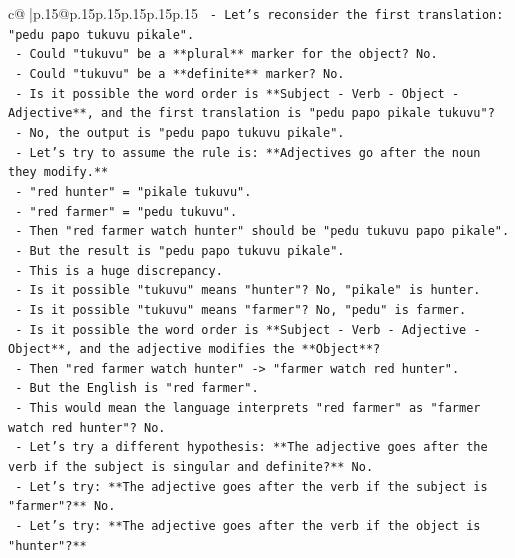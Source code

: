 \documentclass{article}
\begin{document}
{\begin{supertabular}{c@{$\;$}|p{.15\linewidth}@{}p{.15\linewidth}p{.15\linewidth}p{.15\linewidth}p{.15\linewidth}p{.15\linewidth}}
{{{\texttt{       {-} Let's reconsider the first translation: "pedu papo tukuvu pikale".} \\
\texttt{       {-} Could "tukuvu" be a **plural** marker for the object? No.} \\
\texttt{       {-} Could "tukuvu" be a **definite** marker? No.} \\
\texttt{       {-} Is it possible the word order is **Subject {-} Verb {-} Object {-} Adjective**, and the first translation is "pedu papo pikale tukuvu"?} \\
\texttt{         {-} No, the output is "pedu papo tukuvu pikale".} \\
\texttt{       {-} Let's try to assume the rule is: **Adjectives go after the noun they modify.**} \\
\texttt{         {-} "red hunter" = "pikale tukuvu".} \\
\texttt{         {-} "red farmer" = "pedu tukuvu".} \\
\texttt{         {-} Then "red farmer watch hunter" should be "pedu tukuvu papo pikale".} \\
\texttt{         {-} But the result is "pedu papo tukuvu pikale".} \\
\texttt{         {-} This is a huge discrepancy.} \\
\texttt{         {-} Is it possible "tukuvu" means "hunter"? No, "pikale" is hunter.} \\
\texttt{         {-} Is it possible "tukuvu" means "farmer"? No, "pedu" is farmer.} \\
\texttt{         {-} Is it possible the word order is **Subject {-} Verb {-} Adjective {-} Object**, and the adjective modifies the **Object**?} \\
\texttt{           {-} Then "red farmer watch hunter" {-}> "farmer watch red hunter".} \\
\texttt{           {-} But the English is "red farmer".} \\
\texttt{           {-} This would mean the language interprets "red farmer" as "farmer watch red hunter"? No.} \\
\texttt{       {-} Let's try a different hypothesis: **The adjective goes after the verb if the subject is singular and definite?** No.} \\
\texttt{       {-} Let's try: **The adjective goes after the verb if the subject is "farmer"?** No.} \\
\texttt{       {-} Let's try: **The adjective goes after the verb if the object is "hunter"?**} \\
}}}
\end{supertabular}}
\end{document}

